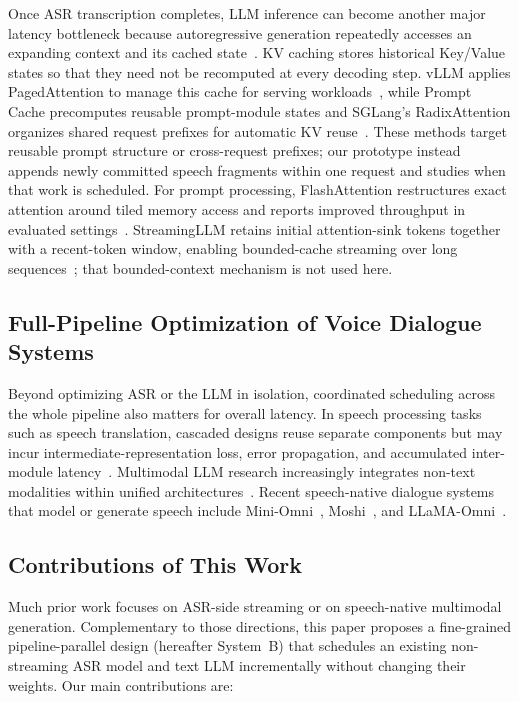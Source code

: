 \documentclass[conference]{IEEEtran}
\begin{document}
Once ASR transcription completes, LLM inference can become another major latency bottleneck because autoregressive generation repeatedly accesses an expanding context and its cached state~\cite{ref7}. KV caching stores historical Key/Value states so that they need not be recomputed at every decoding step. vLLM applies PagedAttention to manage this cache for serving workloads~\cite{kwon2023pagedattention}, while Prompt Cache precomputes reusable prompt-module states and SGLang's RadixAttention organizes shared request prefixes for automatic KV reuse~\cite{gim2024promptcache,zheng2024sglang}. These methods target reusable prompt structure or cross-request prefixes; our prototype instead appends newly committed speech fragments within one request and studies when that work is scheduled. For prompt processing, FlashAttention restructures exact attention around tiled memory access and reports improved throughput in evaluated settings~\cite{dao2022flashattention}. StreamingLLM retains initial attention-sink tokens together with a recent-token window, enabling bounded-cache streaming over long sequences~\cite{xiao2024streamingllm}; that bounded-context mechanism is not used here.

\subsection{Full-Pipeline Optimization of Voice Dialogue Systems}

Beyond optimizing ASR or the LLM in isolation, coordinated scheduling across the whole pipeline also matters for overall latency. In speech processing tasks such as speech translation, cascaded designs reuse separate components but may incur intermediate-representation loss, error propagation, and accumulated inter-module latency~\cite{ref10}. Multimodal LLM research increasingly integrates non-text modalities within unified architectures~\cite{ref11}. Recent speech-native dialogue systems that model or generate speech include Mini-Omni~\cite{xie2024miniomni}, Moshi~\cite{defossez2024moshi}, and LLaMA-Omni~\cite{fang2025llamaomni}.

\subsection{Contributions of This Work}

Much prior work focuses on ASR-side streaming or on speech-native multimodal generation. Complementary to those directions, this paper proposes a fine-grained pipeline-parallel design (hereafter System~B) that schedules an existing non-streaming ASR model and text LLM incrementally without changing their weights. Our main contributions are:
\end{document}
